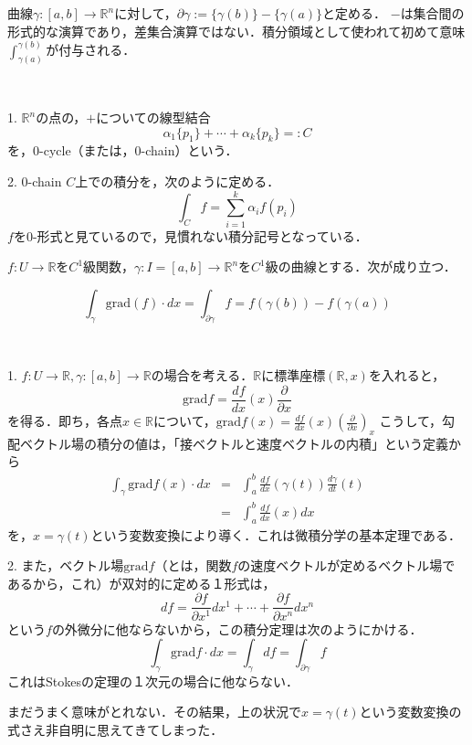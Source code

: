 \documentclass[uplatex, dvipdfmx]{jsreport}
\begin{document}
\begin{definition}[曲線の境界]
    曲線$\gamma:[a,b]\to\mathbb{R}^n$に対して，$\partial\gamma:=\{\gamma(b)\}-\{\gamma(a)\}$と定める．
    $-$は集合間の形式的な演算であり，差集合演算ではない．積分領域として使われて初めて意味$\int^{\gamma(b)}_{\gamma(a)}$が付与される．
\end{definition}

\begin{definition}[0-cycle上での積分]　

    1. $\mathbb{R}^n$の点の，$+$についての線型結合
    \[ \alpha_1\{p_1\}+\cdots+\alpha_k\{p_k\}=:C \]
    を，$0$-cycle（または，$0$-chain）という．

    2. $0$-chain $C$上での積分を，次のように定める．
    \[\int_Cf=\sum^k_{i=1}\alpha_if(p_i)\]
    $f$を$0$-形式と見ているので，見慣れない積分記号となっている．
\end{definition}

\begin{theorem}[勾配ベクトル場に関する積分定理]

    $f:U\to\mathbb{R}$を$C^1$級関数，$\gamma:I=[a,b]\to\mathbb{R}^n$を$C^1$級の曲線とする．次が成り立つ．

    \[ \int_\gamma\mathrm{grad}(f)\cdot dx=\int_{\partial\gamma}f=f(\gamma(b))-f(\gamma(a)) \]
\end{theorem}
\begin{example}　

    1. $f:U\to\mathbb{R}, \gamma:[a,b]\to\mathbb{R}$の場合を考える．$\mathbb{R}$に標準座標$(\mathbb{R},x)$を入れると，
    \[ \mathrm{grad}f=\frac{df}{dx}(x)\frac{\partial}{\partial x} \]
    を得る．即ち，各点$x\in\mathbb{R}$について，$\mathrm{grad}f(x)=\frac{df}{dx}(x)\left(\frac{\partial}{\partial x}\right)_x$
    こうして，勾配ベクトル場の積分の値は，「接ベクトルと速度ベクトルの内積」という定義から
    \begin{eqnarray*}
        \int_\gamma \mathrm{grad}f(x)\cdot dx &=& \int^b_a\frac{df}{dx}(\gamma(t))\frac{d\gamma}{dt}(t) \\
        &=& \int^b_a\frac{df}{dx}(x)dx
    \end{eqnarray*}
    を，$x=\gamma (t)$という変数変換により導く．これは微積分学の基本定理である．

    2. また，ベクトル場$\mathrm{grad}f$（とは，関数$f$の速度ベクトルが定めるベクトル場であるから，これ）が双対的に定める１形式は，
    \[ df=\frac{\partial f}{\partial x^1}dx^1+\cdots +\frac{\partial f}{\partial x^n}dx^n \]
    という$f$の外微分に他ならないから，この積分定理は次のようにかける．
    \[ \int_\gamma\mathrm{grad}f\cdot dx = \int_\gamma df = \int_{\partial\gamma}f \]
    これはStokesの定理の１次元の場合に他ならない．
\end{example}
\begin{remark}
    まだうまく意味がとれない．その結果，上の状況で$x=\gamma (t)$という変数変換の式さえ非自明に思えてきてしまった．
\end{remark}
\end{document}
